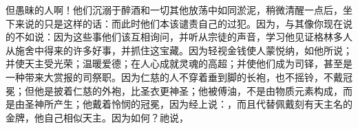 但愚昧的人啊！他们沉溺于醉酒和一切其他放荡中如同淤泥，稍微清醒一点后，坐下来说的只是这样的话：而此时他们本该谴责自己的过犯。因为，与其像你现在说的不如说：因为这些事他们该互相询问，并听从宗徒的声音，学习他见证格林多人从施舍中得来的许多好事，并抓住这宝藏。因为轻视金钱使人蒙悦纳，如他所说；并使天主受光荣；温暖爱德；在人心成就灵魂的高超；并使他们成为司铎，甚至是一种带来大赏报的司祭职。因为仁慈的人不穿着垂到脚的长袍，也不摇铃，不戴冠冕；但他是披着仁慈的外袍，比圣衣更神圣；他被傅油，不是由物质元素构成，而是由圣神所产生；他戴着怜悯的冠冕，因为经上说：，而且代替佩戴刻有天主名的金牌，他自己相似天主。因为如何？祂说，\par

